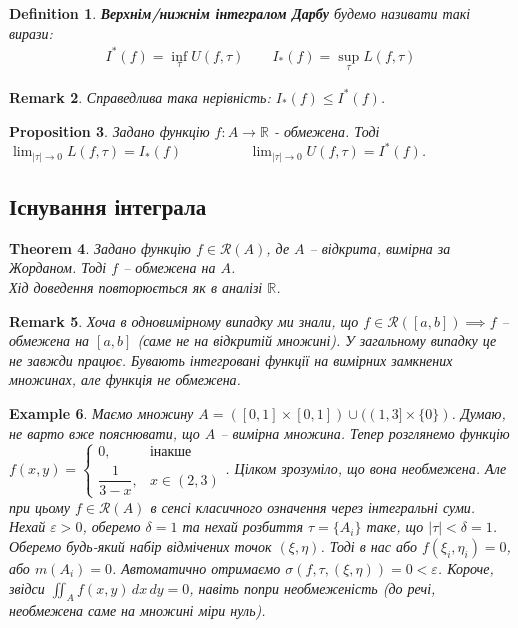 \documentclass[a4paper, 10pt]{article}
\def\huge{\displaystyle}
\theoremstyle{theoremdd}
\newtheorem{theorem}{Theorem}[subsection]
\theoremstyle{theoremdd}
\newtheorem{definition}[theorem]{Definition}
\theoremstyle{theoremdd}
\theoremstyle{theoremdd}
\theoremstyle{theoremdd}
\newtheorem{example}[theorem]{Example}
\theoremstyle{theoremdd}
\theoremstyle{theoremdd}
\theoremstyle{theoremdd}
\theoremstyle{theoremdd}
\newtheorem{proposition}[theorem]{Proposition}
\theoremstyle{theoremdd}
\theoremstyle{theoremdd}
\newtheorem{remark}[theorem]{Remark}
\theoremstyle{theoremdd}
\theoremstyle{theoremdd}
\theoremstyle{theoremdd}
\theoremstyle{theoremdd}
\begin{document}
\begin{definition}
\textbf{Верхнім/нижнім інтегралом Дарбу} будемо називати такі вирази:
\begin{align*}
I^*(f) = \inf_\tau U(f, \tau) \qquad I_*(f) = \sup_\tau L(f,\tau)
\end{align*}
\end{definition}

\begin{remark}
Справедлива така нерівність: $I_*(f) \leq I^*(f)$.
\end{remark}

\begin{proposition}
Задано функцію $f \colon A \to \mathbb{R}$ - обмежена. Тоді\\
$\huge\lim_{|\tau| \to 0} L(f,\tau) = I_*(f) \hspace{2cm} \lim_{|\tau| \to 0} U(f,\tau) = I^*(f)$.
\end{proposition}

\subsection{Існування інтеграла}
\begin{theorem}
Задано функцію $f \in \mathcal{R}(A)$, де $A$ -- відкрита, вимірна за Жорданом. Тоді $f$ -- обмежена на $A$.\\
\textit{Хід доведення повторюється як в аналізі $\mathbb{R}$.}
\end{theorem}

\begin{remark}
Хоча в одновимірному випадку ми знали, що $f \in \mathcal{R}([a,b]) \implies f$ -- обмежена на $[a,b]$ (саме не на відкритій множині). У загальному випадку це не завжди працює. Бувають інтегровані функції на вимірних замкнених множинах, але функція не обмежена.
\end{remark}

\begin{example}
Маємо множину $A = ([0,1] \times [0,1]) \cup ((1,3] \times \{0\})$. Думаю, не варто вже пояснювати, що $A$ -- вимірна множина. Тепер розглянемо функцію $f(x,y) = \begin{cases} 0, & \text{інакше} \\ \dfrac{1}{3-x}, & x \in (2,3) \end{cases}$. Цілком зрозуміло, що вона необмежена. Але при цьому $f \in \mathcal{R}(A)$ в сенсі класичного означення через інтегральні суми.\\
Нехай $\varepsilon > 0$, оберемо $\delta = 1$ та нехай розбиття $\tau = \{A_i\}$ таке, що $|\tau| < \delta = 1$. Оберемо будь-який набір відмічених точок $(\xi,\eta)$. Тоді в нас або $f(\xi_i,\eta_i) = 0$, або $m(A_i) = 0$. Автоматично отримаємо $\sigma(f,\tau,(\xi,\eta)) = 0 < \varepsilon$. Короче, звідси $\displaystyle\iint_A f(x,y)\,dx\,dy = 0$, навіть попри необмеженість (до речі, необмежена саме на множині міри нуль).
\end{example}
\end{document}
